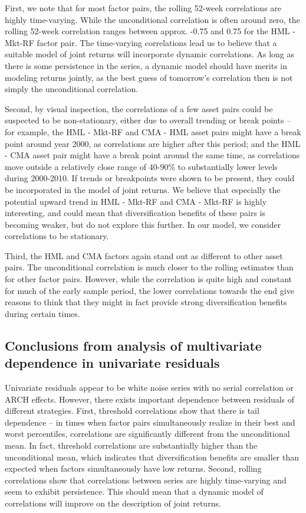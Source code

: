 First, we note that for most factor pairs, the rolling 52-week correlations are highly time-varying. While the unconditional correlation is often around zero, the rolling 52-week correlation ranges between approx. -0.75 and 0.75 for the HML - Mkt-RF factor pair. The time-varying correlations lead us to believe that a suitable model of joint returns will incorporate dynamic correlations. As long as there is some persistence in the series, a dynamic model should have merits in modeling returns jointly, as the best guess of tomorrow's correlation then is not simply the unconditional correlation.

Second, by visual inspection, the correlations of a few asset pairs could be suspected to be non-stationary, either due to overall trending or break points -- for example, the HML - Mkt-RF and CMA - HML asset pairs might have a break point around year 2000, as correlations are higher after this period; and the HML - CMA asset pair might have a break point around the same time, as correlations move outside a relatively close range of 40-90\% to substantially lower levels during 2000-2010. If trends or breakpoints were shown to be present, they could be incorporated in the model of joint returns. We believe that especially the potential upward trend in HML - Mkt-RF and CMA - Mkt-RF is highly interesting, and could mean that diversification benefits of these pairs is becoming weaker, but do not explore this further. In our model, we consider correlations to be stationary.

Third, the HML and CMA factors again stand out as different to other asset pairs. The unconditional correlation is much closer to the rolling estimates than for other factor pairs. However, while the correlation is quite high and constant for much of the early sample period, the lower correlations towards the end give reasons to think that they might in fact provide strong diversification benefits during certain times.

\subsection{Conclusions from analysis of multivariate dependence in univariate residuals}
Univariate residuals appear to be white noise series with no serial correlation or ARCH effects. However, there exists important dependence between residuals of different strategies. First, threshold correlations show that there is tail dependence -- in times when factor pairs simultaneously realize in their best and worst percentiles, correlations are significantly different from the unconditional mean. In fact, threshold correlations are substantially higher than the unconditional mean, which indicates that diversification benefits are smaller than expected when factors simultaneously have low returns. Second, rolling correlations show that correlations between series are highly time-varying and seem to exhibit persistence. This should mean that a dynamic model of correlations will improve on the description of joint returns.

